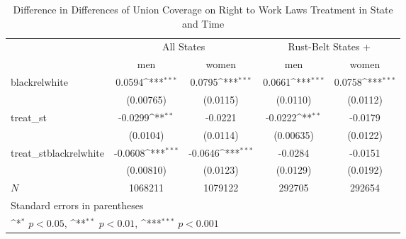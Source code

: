 \begin{table}[htbp]\centering
\def\sym#1{\ifmmode^{#1}\else\(^{#1}\)\fi}
\caption{Difference in Differences of Union Coverage on Right to Work Laws Treatment in State and Time}
\begin{tabular}{l*{4}{c}}
\hline\hline
            &\multicolumn{2}{c}{All States}             &\multicolumn{2}{c}{Rust-Belt States +}     \\\cmidrule(lr){2-3}\cmidrule(lr){4-5}
            &\multicolumn{1}{c}{men}&\multicolumn{1}{c}{women}&\multicolumn{1}{c}{men}&\multicolumn{1}{c}{women}\\
\hline
blackrelwhite&      0.0594\sym{***}&      0.0795\sym{***}&      0.0661\sym{***}&      0.0758\sym{***}\\
            &   (0.00765)         &    (0.0115)         &    (0.0110)         &    (0.0112)         \\
[1em]
treat\_st    &     -0.0299\sym{**} &     -0.0221         &     -0.0222\sym{**} &     -0.0179         \\
            &    (0.0104)         &    (0.0114)         &   (0.00635)         &    (0.0122)         \\
[1em]
treat\_stblackrelwhite&     -0.0608\sym{***}&     -0.0646\sym{***}&     -0.0284         &     -0.0151         \\
            &   (0.00810)         &    (0.0123)         &    (0.0129)         &    (0.0192)         \\
\hline
\(N\)       &     1068211         &     1079122         &      292705         &      292654         \\
\hline\hline
\multicolumn{5}{l}{\footnotesize Standard errors in parentheses}\\
\multicolumn{5}{l}{\footnotesize \sym{*} \(p<0.05\), \sym{**} \(p<0.01\), \sym{***} \(p<0.001\)}\\
\end{tabular}
\end{table}

